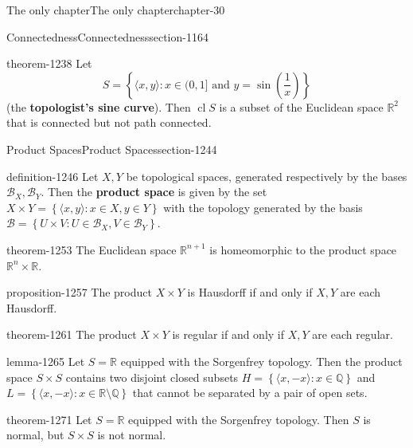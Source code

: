 \documentclass[oneside,10pt,]{book}
\newcommand{\terminology}[1]{\textbf{#1}}
\newcommand{\tuple}[1]{\langle #1 \rangle}
\newcommand{\mb}{\mathbb}
\newcommand{\mc}{\mathcal}
\newcommand{\cl}{\operatorname{cl}}
\newcommand{\setBuilder}[2]{\left\{#1:#2\right\}}
\begin{document}
\begin{chapterptx}{The only chapter}{}{The only chapter}{}{}{chapter-30}
\begin{sectionptx}{Connectedness}{}{Connectedness}{}{}{section-1164}
\begin{theorem}{}{}{theorem-1238}%
\hypertarget{p-1239}{}%
Let%
\begin{equation*}
S=
\setBuilder{\tuple{x,y}}{x\in(0,1]\text{ and }
y=\sin\left(\frac{1}{x}\right)}
\end{equation*}
(the \terminology{topologist's sine curve}). Then \(\cl S\) is a subset of the Euclidean space \(\mb R^2\) that is connected but not path connected.%
\end{theorem}
\end{sectionptx}
%
%
\typeout{************************************************}
\typeout{************************************************}
%
\begin{sectionptx}{Product Spaces}{}{Product Spaces}{}{}{section-1244}
\begin{definition}{}{definition-1246}%
\hypertarget{p-1247}{}%
Let \(X,Y\) be topological spaces, generated respectively by the bases \(\mc B_X,\mc B_Y\). Then the \terminology{product space} is given by the set \(X\times Y=\setBuilder{\tuple{x,y}}{x\in X,y\in Y}\) with the topology generated by the basis \(\mc B=\setBuilder{U\times V}{U\in\mc B_X,V\in\mc B_Y}\).%
\end{definition}
\begin{theorem}{}{}{theorem-1253}%
\hypertarget{p-1254}{}%
The Euclidean space \(\mb R^{n+1}\) is homeomorphic to the product space \(\mb R^n\times\mb R\).%
\end{theorem}
\begin{proposition}{}{}{proposition-1257}%
\hypertarget{p-1258}{}%
The product \(X\times Y\) is Hausdorff if and only if \(X,Y\) are each Hausdorff.%
\end{proposition}
\begin{theorem}{}{}{theorem-1261}%
\hypertarget{p-1262}{}%
The product \(X\times Y\) is regular if and only if \(X,Y\) are each regular.%
\end{theorem}
\begin{lemma}{}{}{lemma-1265}%
\hypertarget{p-1266}{}%
Let \(S=\mb R\) equipped with the Sorgenfrey topology. Then the product space \(S\times S\) contains two disjoint closed subsets \(H=\setBuilder{\tuple{x,-x}}{x\in\mb Q}\) and \(L=\setBuilder{\tuple{x,-x}}{x\in\mb R\setminus\mb Q}\) that cannot be separated by a pair of open sets.%
\end{lemma}
\begin{theorem}{}{}{theorem-1271}%
\hypertarget{p-1272}{}%
Let \(S=\mb R\) equipped with the Sorgenfrey topology. Then \(S\) is normal, but \(S\times S\) is not normal.%

\end{theorem}
\end{sectionptx}
\end{chapterptx}
\end{document}
